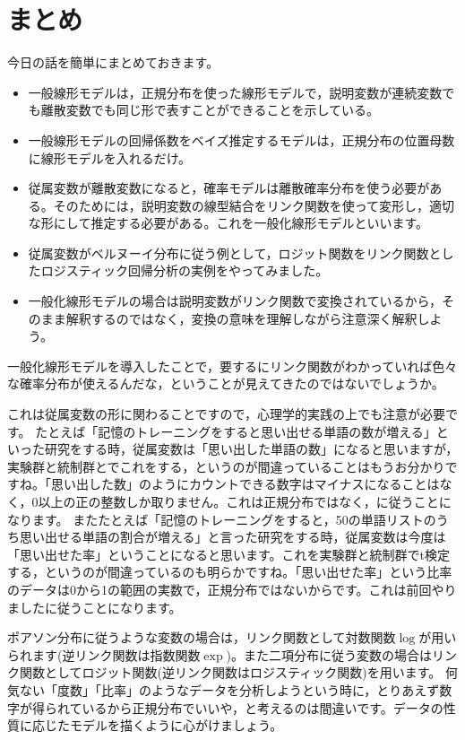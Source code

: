 \documentclass{ltjsbook}
\begin{document}
\section{まとめ}
今日の話を簡単にまとめておきます。
\begin{itemize}
	\item 一般線形モデルは，正規分布を使った線形モデルで，説明変数が連続変数でも離散変数でも同じ形で表すことができることを示している。
	\item 一般線形モデルの回帰係数をベイズ推定するモデルは，正規分布の位置母数に線形モデルを入れるだけ。
	\item 従属変数が離散変数になると，確率モデルは離散確率分布を使う必要がある。そのためには，説明変数の線型結合をリンク関数を使って変形し，適切な形にして推定する必要がある。これを一般化線形モデルといいます。
	\item 従属変数がベルヌーイ分布に従う例として，ロジット関数をリンク関数としたロジスティック回帰分析の実例をやってみました。
	\item 一般化線形モデルの場合は説明変数がリンク関数で変換されているから，そのまま解釈するのではなく，変換の意味を理解しながら注意深く解釈しよう。
\end{itemize}
一般化線形モデルを導入したことで，要するにリンク関数がわかっていれば色々な確率分布が使えるんだな，ということが見えてきたのではないでしょうか。

これは従属変数の形に関わることですので，心理学的実践の上でも注意が必要です。
たとえば「記憶のトレーニングをすると思い出せる単語の数が増える」といった研究をする時，従属変数は「思い出した単語の数」になると思いますが，実験群と統制群とでこれをする，というのが間違っていることはもうお分かりですね。「思い出した数」のようにカウントできる数字はマイナスになることはなく，0以上の正の整数しか取りません。これは正規分布ではなく，に従うことになります。
またたとえば「記憶のトレーニングをすると，50の単語リストのうち思い出せる単語の割合が増える」と言った研究をする時，従属変数は今度は「思い出せた率」ということになると思います。これを実験群と統制群でt検定する，というのが間違っているのも明らかですね。「思い出せた率」という比率のデータは0から1の範囲の実数で，正規分布ではないからです。これは前回やりましたに従うことになります。

ポアソン分布に従うような変数の場合は，リンク関数として対数関数$\log$が用いられます(逆リンク関数は指数関数$\exp$)。また二項分布に従う変数の場合はリンク関数としてロジット関数(逆リンク関数はロジスティック関数)を用います。
何気ない「度数」「比率」のようなデータを分析しようという時に，とりあえず数字が得られているから正規分布でいいや，と考えるのは間違いです。データの性質に応じたモデルを描くように心がけましょう。
\end{document}

